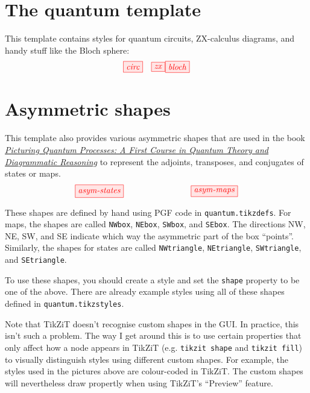 \documentclass{article}
\begin{document}
\section*{The quantum template}

This template contains styles for quantum circuits, ZX-calculus diagrams, and handy stuff like the Bloch sphere:
\[
\tikzfig{circ} \quad
\tikzfig{zx}
\tikzfig{bloch}
\]

\section*{Asymmetric shapes}

This template also provides various asymmetric shapes that are used in the book \href{http://cambridge.org/PQP}{\color{blue} \textit{Picturing Quantum Processes: A First Course in Quantum Theory and Diagrammatic Reasoning}} to represent the adjoints, transposes, and conjugates of states or maps.
\[
  \tikzfig{asym-states}
  \qquad\qquad\qquad\qquad
  \tikzfig{asym-maps}
\]

These shapes are defined by hand using PGF code in \texttt{quantum.tikzdefs}. For maps, the shapes are called \texttt{NWbox}, \texttt{NEbox}, \texttt{SWbox}, and \texttt{SEbox}. The directions NW, NE, SW, and SE indicate which way the asymmetric part of the box ``points''. Similarly, the shapes for states are called \texttt{NWtriangle}, \texttt{NEtriangle}, \texttt{SWtriangle}, and \texttt{SEtriangle}.

To use these shapes, you should create a style and set the \texttt{shape} property to be one of the above. There are already example styles using all of these shapes defined in \texttt{quantum.tikzstyles}.

Note that TikZiT doesn't recognise custom shapes in the GUI. In practice, this isn't such a problem. The way I get around this is to use certain properties that only affect how a node appears in TikZiT (e.g. \texttt{tikzit shape} and \texttt{tikzit fill}) to visually distinguish styles using different custom shapes. For example, the styles used in the pictures above are colour-coded in TikZiT. The custom shapes will nevertheless draw propertly when using TikZiT's ``Preview'' feature.
\end{document}
